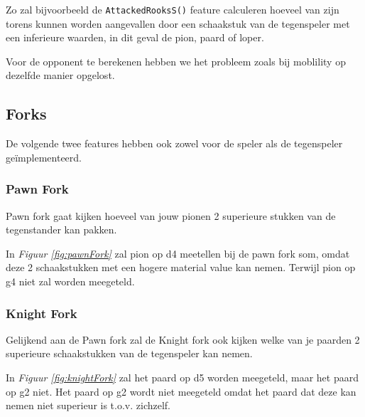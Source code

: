 \documentclass[a4paper,openany]{uantwerpenassignment}
\newcommand{\codeword}[1]{
    \colorbox{code}{\texttt{\textcolor{codetext}{#1}}}
}
\newcommand{\figref}[1]{\textit{Figuur \ref{#1}}}
\begin{document}
Zo zal bijvoorbeeld de \codeword{AttackedRooksS()} feature calculeren hoeveel van zijn torens kunnen worden aangevallen door een schaakstuk van de tegenspeler met een inferieure waarden, in dit geval de pion, paard of loper.

Voor de opponent te berekenen hebben we het probleem zoals bij moblility op dezelfde manier opgelost.

\subsection{Forks}

De volgende twee features hebben ook zowel voor de speler als de tegenspeler geïmplementeerd.

\subsubsection{Pawn Fork}
Pawn fork gaat kijken hoeveel van jouw pionen 2 superieure stukken van de tegenstander kan pakken.

In \figref{fig:pawnFork} zal pion op d4 meetellen bij de pawn fork som, omdat deze 2 schaakstukken met een hogere material value kan nemen. Terwijl pion op g4 niet zal worden meegeteld.

\subsubsection{Knight Fork}
Gelijkend aan de Pawn fork zal de Knight fork ook kijken welke van je paarden 2 superieure schaakstukken van de tegenspeler kan nemen.

In \figref{fig:knightFork} zal het paard op d5 worden meegeteld, maar het paard op g2 niet. Het paard op g2 wordt niet meegeteld omdat het paard dat deze kan nemen niet superieur is t.o.v. zichzelf.
\end{document}
